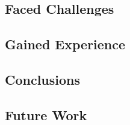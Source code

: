 \subsection{Faced Challenges}

\subsection{Gained Experience}

\subsection{Conclusions}

\subsection{Future Work}
